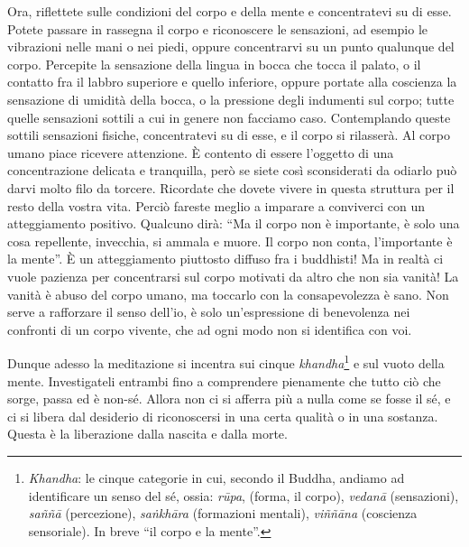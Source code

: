 Ora, riflettete sulle condizioni del corpo e della mente e concentratevi
su di esse. Potete passare in rassegna il corpo e riconoscere le
sensazioni, ad esempio le vibrazioni nelle mani o nei piedi, oppure
concentrarvi su un punto qualunque del corpo. Percepite la sensazione
della lingua in bocca che tocca il palato, o il contatto fra il labbro
superiore e quello inferiore, oppure portate alla coscienza la
sensazione di umidità della bocca, o la pressione degli indumenti sul
corpo; tutte quelle sensazioni sottili a cui in genere non facciamo
caso. Contemplando queste sottili sensazioni fisiche, concentratevi su
di esse, e il corpo si rilasserà. Al corpo umano piace ricevere
attenzione. È contento di essere l'oggetto di una concentrazione
delicata e tranquilla, però se siete così sconsiderati da odiarlo può
darvi molto filo da torcere. Ricordate che dovete vivere in questa
struttura per il resto della vostra vita. Perciò fareste meglio a
imparare a conviverci con un atteggiamento positivo. Qualcuno dirà: ``Ma
il corpo non è importante, è solo una cosa repellente, invecchia, si
ammala e muore. Il corpo non conta, l'importante è la mente''. È un
atteggiamento piuttosto diffuso fra i buddhisti! Ma in realtà ci vuole
pazienza per concentrarsi sul corpo motivati da altro che non sia vanità!
La vanità è abuso del corpo umano, ma toccarlo con la consapevolezza è
sano. Non serve a rafforzare il senso dell'io, è solo un'espressione di
benevolenza nei confronti di un corpo vivente, che ad ogni modo non si
identifica con voi.

Dunque adesso la meditazione si incentra sui cinque \textit{khandha}\footnote{\textit{Khandha}: le cinque categorie in cui, secondo il Buddha,
andiamo ad identificare un senso del sé, ossia: \textit{rūpa}, (forma, il corpo),
\textit{vedanā} (sensazioni), \textit{saññā} (percezione), \textit{saṅkhāra} (formazioni mentali),
\textit{viññāna} (coscienza sensoriale). In breve ``il corpo e la mente''.} e
sul vuoto della mente. Investigateli entrambi fino a comprendere
pienamente che tutto ciò che sorge, passa ed è non-sé. Allora non ci si
afferra più a nulla come se fosse il sé, e ci si libera dal desiderio di
riconoscersi in una certa qualità o in una sostanza. Questa è la
liberazione dalla nascita e dalla morte.

